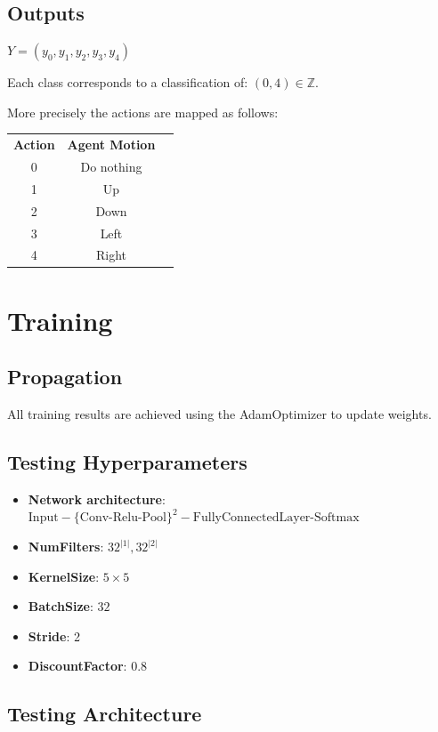 \documentclass{article}
\begin{document}
\subsection{Outputs}
$Y=(y_0, y_1, y_2, y_{3}, y_{4})$

\noindent
Each class corresponds to a classification of: $(0,4) \in \mathbb{Z} $.

\noindent
More precisely the actions are mapped as follows:

\noindent
\begin{tabular}{ |c|c|c| } 
 \hline
 \textbf{Action} & \textbf{Agent Motion} \\ 
 0 & Do nothing \\ 
 1 & Up \\ 
 2 & Down\\
 3 & Left \\ 
 4 & Right\\
 \hline
\end{tabular}

\section{Training}

\subsection{Propagation}
All training results are achieved using the AdamOptimizer to update weights.

\subsection{Testing Hyperparameters}
\begin{itemize}
\item \textbf{Network architecture}: $\textrm{Input}-\{\textrm{Conv-Relu-Pool}\}^2-\textrm{FullyConnectedLayer-Softmax}$
\item \textbf{NumFilters}: $32^{|1|},32^{|2|}$
\item \textbf{KernelSize}: $5\times 5$
\item \textbf{BatchSize}: $32$
\item \textbf{Stride}: 2
\item \textbf{DiscountFactor}: $0.8$
\end{itemize}

\subsection*{Testing Architecture}
\end{document}
